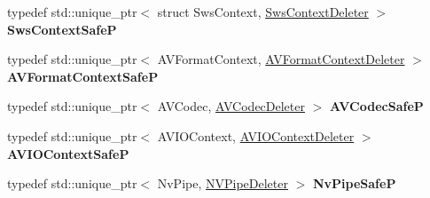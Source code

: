\begin{DoxyCompactItemize}
\item 
\mbox{\label{namespacemoetsi_1_1ssp_a49cbd5c92ea7444379acded166f57d37}} 
typedef std\+::unique\+\_\+ptr$<$ struct Sws\+Context, \hyperlink{structmoetsi_1_1ssp_1_1SwsContextDeleter}{Sws\+Context\+Deleter} $>$ {\bfseries Sws\+Context\+SafeP}
\item 
\mbox{\label{namespacemoetsi_1_1ssp_a7a7d378c3f187efeeb5d3c29ae6c44a2}} 
typedef std\+::unique\+\_\+ptr$<$ A\+V\+Format\+Context, \hyperlink{structmoetsi_1_1ssp_1_1AVFormatContextDeleter}{A\+V\+Format\+Context\+Deleter} $>$ {\bfseries A\+V\+Format\+Context\+SafeP}
\item 
\mbox{\label{namespacemoetsi_1_1ssp_a42ebc9bfaf2c74561087124f6d338000}} 
typedef std\+::unique\+\_\+ptr$<$ A\+V\+Codec, \hyperlink{structmoetsi_1_1ssp_1_1AVCodecDeleter}{A\+V\+Codec\+Deleter} $>$ {\bfseries A\+V\+Codec\+SafeP}
\item 
\mbox{\label{namespacemoetsi_1_1ssp_a05bed920ea0d44b91cd3052e97c2bdf3}} 
typedef std\+::unique\+\_\+ptr$<$ A\+V\+I\+O\+Context, \hyperlink{structmoetsi_1_1ssp_1_1AVIOContextDeleter}{A\+V\+I\+O\+Context\+Deleter} $>$ {\bfseries A\+V\+I\+O\+Context\+SafeP}
\item 
\mbox{\label{namespacemoetsi_1_1ssp_a9113dc526e642001a9213326b2c5539f}} 
typedef std\+::unique\+\_\+ptr$<$ Nv\+Pipe, \hyperlink{structmoetsi_1_1ssp_1_1NVPipeDeleter}{N\+V\+Pipe\+Deleter} $>$ {\bfseries Nv\+Pipe\+SafeP}
\end{DoxyCompactItemize}
